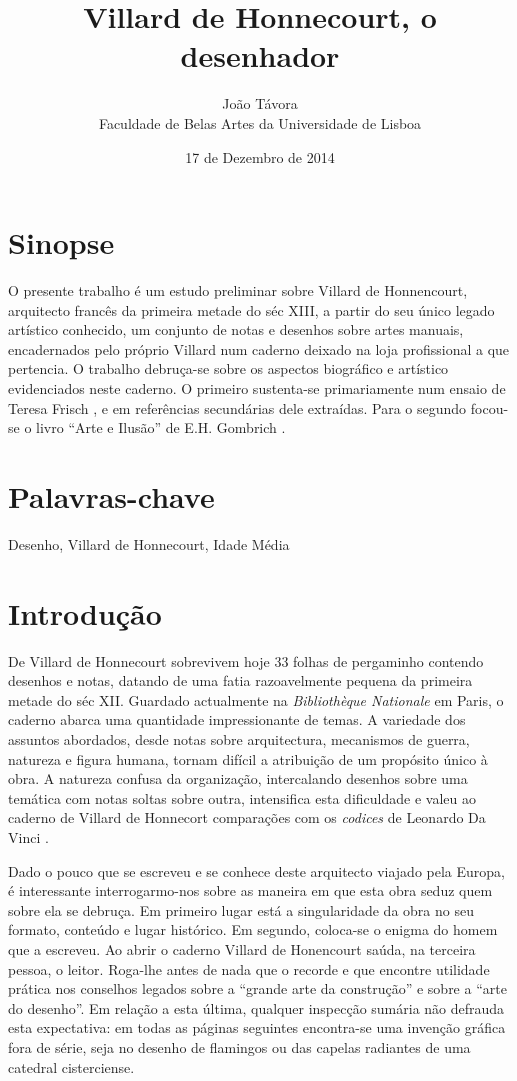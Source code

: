 \documentclass{article}
\title{Villard de Honnecourt, o desenhador}
\date{17 de Dezembro de 2014}
\author{João Távora \\Faculdade de Belas Artes da Universidade de Lisboa}
\begin{document}
\maketitle

\section{Sinopse}

O presente trabalho é um estudo preliminar sobre Villard de
Honnencourt, arquitecto francês da primeira metade do séc XIII, a
partir do seu único legado artístico conhecido, um conjunto de notas e
desenhos sobre artes manuais, encadernados pelo próprio Villard num
caderno deixado na loja profissional a que pertencia. O trabalho
debruça-se sobre os aspectos biográfico e artístico evidenciados neste
caderno. O primeiro sustenta-se primariamente num ensaio de Teresa
Frisch \cite{teresa}, e em referências secundárias dele
extraídas. Para o segundo focou-se o livro ``Arte e Ilusão'' de
E.H. Gombrich \cite{gombrich}.

\section{Palavras-chave}

Desenho, Villard de Honnecourt, Idade Média

\section{Introdução}

De Villard de Honnecourt sobrevivem hoje 33 folhas de pergaminho
contendo desenhos e notas, datando de uma fatia razoavelmente pequena
da primeira metade do séc XII. Guardado actualmente na
\emph{Bibliothèque Nationale} em Paris, o caderno abarca uma
quantidade impressionante de temas. A variedade dos assuntos
abordados, desde notas sobre arquitectura, mecanismos de guerra,
natureza e figura humana, tornam difícil a atribuição de um propósito
único à obra. A natureza confusa da organização, intercalando desenhos
sobre uma temática com notas soltas sobre outra, intensifica esta
dificuldade e valeu ao caderno de Villard de Honnecort comparações com
os \emph{codices} de Leonardo Da Vinci \cite{teresa}.

Dado o pouco que se escreveu e se conhece deste arquitecto viajado
pela Europa, é interessante interrogarmo-nos sobre as maneira em que
esta obra seduz quem sobre ela se debruça. Em primeiro lugar está a
singularidade da obra no seu formato, conteúdo e lugar histórico. Em
segundo, coloca-se o enigma do homem que a escreveu. Ao abrir o
caderno Villard de Honencourt saúda, na terceira pessoa, o
leitor. Roga-lhe antes de nada que o recorde e que encontre utilidade
prática nos conselhos legados sobre a ``grande arte da construção'' e
sobre a ``arte do desenho''. Em relação a esta última, qualquer
inspecção sumária não defrauda esta expectativa: em todas as páginas
seguintes encontra-se uma invenção gráfica fora de série, seja no
desenho de flamingos ou das capelas radiantes de uma catedral
cisterciense.
\end{document}
